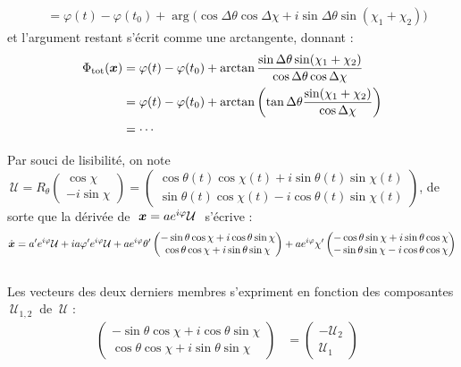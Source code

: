 \begin{annexe}
\begin{demo}
\begin{align*}
		&= \varphi(t) - \varphi(t_0) + \arg\Big( \cos\Delta\theta \cos\Delta\chi + i\sin\Delta\theta \sin(\chi_1+\chi_2) \Big)
	\end{align*}
	et l'argument restant s'écrit comme une arctangente, donnant :
	\begin{align*}
		\Phi_{\text{\normalfont tot}}(\boldsymbol{x}) &= \varphi(t)-\varphi(t_0) + \arctan\frac{\sin\Delta\theta \sin(\chi_1+\chi_2)}{\cos\Delta\theta \cos\Delta\chi} \\
		&= \varphi(t)-\varphi(t_0) + \arctan \left( \tan\Delta\theta\frac{\sin(\chi_1+\chi_2)}{\cos\Delta\chi} \right) \\
		&= \cdots
	\end{align*}
\end{demo}

\begin{demo}
	Par souci de lisibilité, on note $\ \mathcal{U} = R_{\theta} \begin{pmatrix} \cos\chi \\ -i\sin\chi \end{pmatrix} = \begin{pmatrix} \cos\theta(t) \cos\chi(t) + i\sin\theta(t) \sin\chi(t) \\ \sin\theta(t) \cos\chi(t) - i\cos\theta(t) \sin\chi(t) \end{pmatrix}$, de sorte que la dérivée de $\ \x=ae^{i\varphi}\mathcal{U}\ $ s'écrive :
	\[\dot{\boldsymbol{x}} = a'e^{i\varphi}\mathcal{U} + ia\varphi'e^{i\varphi} \mathcal{U} + ae^{i\varphi}\theta'\begin{pmatrix} -\sin\theta \cos\chi + i\cos\theta \sin\chi \\ \cos\theta \cos\chi + i\sin\theta \sin\chi \end{pmatrix} + ae^{i\varphi}\chi'\begin{pmatrix} -\cos\theta \sin\chi + i\sin\theta \cos\chi \\ -\sin\theta \sin\chi - i\cos\theta \cos\chi \end{pmatrix}\]
	\\
	Les vecteurs des deux derniers membres s'expriment en fonction des composantes $\ \mathcal{U}_{1,2}\ $ de $\ \mathcal{U}$ :
	\begin{align*}
		\begin{pmatrix} -\sin\theta \cos\chi + i\cos\theta \sin\chi \\ \cos\theta \cos\chi + i\sin\theta \sin\chi \end{pmatrix} &= \begin{pmatrix} -\mathcal{U}_2 \\ \mathcal{U}_1 \end{pmatrix}  &

\end{align*}
\end{demo}
\end{annexe}
